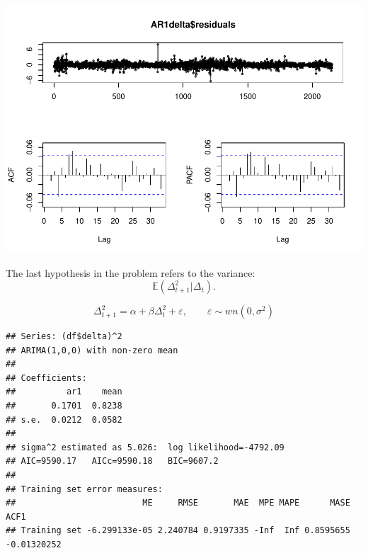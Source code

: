 \documentclass[11pt, a4paper]{report}
\newenvironment{Shaded}{\begin{snugshade}}{\end{snugshade}}
\newcommand{\DataTypeTok}[1]{\textcolor[rgb]{0.13,0.29,0.53}{#1}}
\newcommand{\DecValTok}[1]{\textcolor[rgb]{0.00,0.00,0.81}{#1}}
\newcommand{\KeywordTok}[1]{\textcolor[rgb]{0.13,0.29,0.53}{\textbf{#1}}}
\newcommand{\NormalTok}[1]{#1}
\newcommand{\OperatorTok}[1]{\textcolor[rgb]{0.81,0.36,0.00}{\textbf{#1}}}
\newcommand{\StringTok}[1]{\textcolor[rgb]{0.31,0.60,0.02}{#1}}
\theoremstyle{plain}
\theoremstyle{plain}
\theoremstyle{remark}
\begin{document}
\begin{Shaded}
\end{Shaded}

\begin{center}\includegraphics{Econo2_P1_files/figure-latex/delta 1-2} \end{center}

The last hypothesis in the problem refers to the variance:
\[\mathbb{E}(\Delta_{t+1}^2 | \Delta_t).\]

\[\Delta^2_{t+1} = \alpha + \beta \Delta^2_t + \varepsilon, \hspace{2em} \varepsilon \sim wn(0, \sigma^2)\]

\begin{Shaded}
\end{Shaded}

\begin{verbatim}
## Series: (df$delta)^2 
## ARIMA(1,0,0) with non-zero mean 
## 
## Coefficients:
##          ar1    mean
##       0.1701  0.8238
## s.e.  0.0212  0.0582
## 
## sigma^2 estimated as 5.026:  log likelihood=-4792.09
## AIC=9590.17   AICc=9590.18   BIC=9607.2
## 
## Training set error measures:
##                         ME     RMSE       MAE  MPE MAPE      MASE        ACF1
## Training set -6.299133e-05 2.240784 0.9197335 -Inf  Inf 0.8595655 -0.01320252
\end{verbatim}
\end{document}
